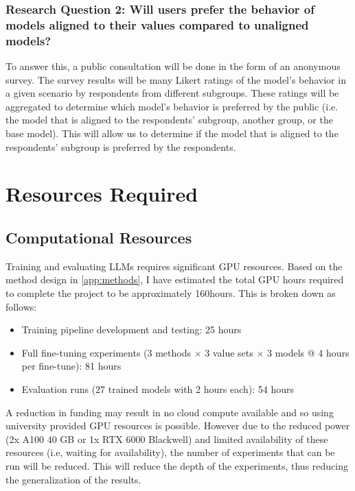 \documentclass[11pt, a4paper]{article}
\newcommand{\gpuHours}{160}
\begin{document}
\subsubsection{Research Question 2: Will users prefer the behavior of models aligned to their values compared to unaligned models?}

To answer this, a public consultation will be done in the form of an anonymous survey. The survey results will be many Likert ratings of the model's behavior in a given scenario by respondents from different subgroups. These ratings will be aggregated to determine which model's behavior is preferred by the public (i.e. the model that is aligned to the respondents' subgroup, another group, or the base model). This will allow us to determine if the model that is aligned to the respondents' subgroup is preferred by the respondents.

\section{Resources Required}
\label{app:resources}

\subsection{Computational Resources}

Training and evaluating LLMs requires significant GPU resources. Based on the method design in \ref{app:methods}, I have estimated the total GPU hours required to complete the project to be approximately \gpuHours hours. This is broken down as follows:

\begin{itemize}
	\item Training pipeline development and testing: 25 hours
	\item Full fine-tuning experiments (3 methods $\times$ 3 value sets $\times$ 3 models @ 4 hours per fine-tune): 81 hours
	\item Evaluation runs (27 trained models with 2 hours each): 54 hours
\end{itemize}

A reduction in funding may result in no cloud compute available and so using university provided GPU resources is possible. However due to the reduced power (2x A100 40 GB or 1x RTX 6000 Blackwell) and limited availability of these resources (i.e, waiting for availability), the number of experiments that can be run will be reduced. This will reduce the depth of the experiments, thus reducing the generalization of the results.
\end{document}
